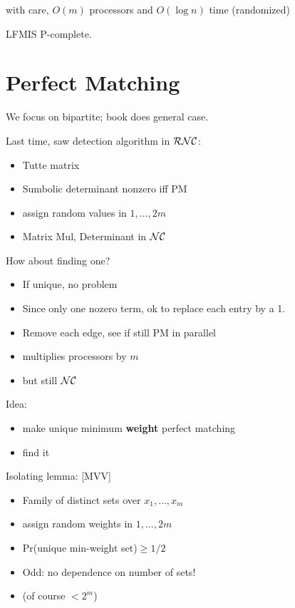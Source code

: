 \documentclass[12pt]{article}
\begin{document}
with care, $O(m)$ processors and $O(\log n)$ time (randomized)

LFMIS P-complete.


\section*{Perfect Matching}

We focus on bipartite; book does general case.


Last time, saw detection algorithm in $\cal{R}\cal{N}\cal{C}$:
\begin{itemize}
\item Tutte matrix
\item Sumbolic determinant nonzero iff PM
\item assign random values in $1,\ldots,2m$
\item Matrix Mul, Determinant in $\cal{N} \cal{C}$
\end{itemize}

How about finding one?
\begin{itemize}
\item If unique, no problem
\item Since only one nozero term, ok to replace each entry by a 1.
\item Remove each edge, see if still PM in parallel
\item multiplies processors by $m$
\item but still $\cal{N} \cal{C}$
\end{itemize}

Idea: 
\begin{itemize}
\item make unique minimum \textbf{weight} perfect matching
\item find it
\end{itemize}

Isolating lemma: [MVV]
\begin{itemize}
\item Family of distinct sets over $x_1,\ldots,x_m$
\item assign random weights in $1,\ldots,2m$
\item Pr(unique min-weight set)$\ge 1/2$
\item Odd: no dependence on number of sets! 
\item (of course $<2^m$)
\end{itemize}
\end{document}

